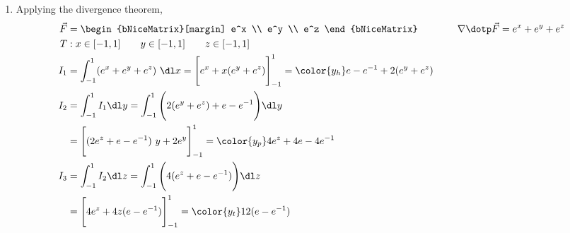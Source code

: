 \begin{enumerate}
    \item Applying the divergence theorem,
          \begin{align}
              \vec{F} & = \begin{bNiceMatrix}[margin]
                              e^x \\ e^y \\ e^z
                          \end{bNiceMatrix} \qquad\qquad
              \nabla \dotp \vec{F} = e^x + e^y + e^z                              \\
              T       & : x \in [-1, 1] \qquad y \in [-1, 1] \qquad z \in [-1, 1] \\
              I_1     & = \int_{-1}^{1} (e^x + e^y + e^z) \ \dl x
              = \Bigg[ e^x + x(e^y + e^z) \Bigg]_{-1}^{1}
              = {\color{y_h} e - e^{-1} + 2(e^y + e^z)}                           \\
              I_2     & = \int_{-1}^{1} I_1 \dl y
              = \int_{-1}^{1} \Bigg( 2(e^y + e^z) + e - e^{-1} \Bigg) \dl y       \\
                      & = \Bigg[ (2e^z + e - e^{-1})\ y + 2e^y \Bigg]_{-1}^{1}
              = {\color{y_p} 4e^z + 4e - 4e^{-1} }                                \\
              I_3     & = \int_{-1}^{1} I_2 \dl z = \int_{-1}^{1}
              \Bigg( 4(e^z + e - e^{-1}) \Bigg) \dl z                             \\
                      & = \Bigg[ 4e^z + 4z(e - e^{-1}) \Bigg]_{-1}^{1}
              = {\color{y_t} 12 (e - e^{-1})}
          \end{align}


\end{enumerate}
